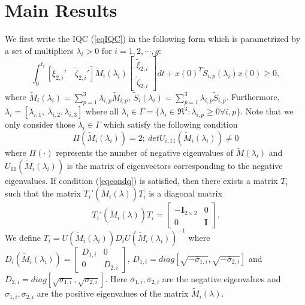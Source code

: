 \documentclass[twocolumn]{autart}
\begin{document}
\section{Main Results}\label{sec:main}
We first write the IQC (\ref{eqIQC}) in the following form which is parametrized by a set of multipliers $\lambda_i>0$ for $i=1,2,\cdots,g$:
\begin{equation}
\label{eqIQCM}
\int_0^{t_i}  [\tilde{\xi}_{2,i}' \quad \tilde{\zeta}_{2,i}'] \tilde{M}_{i}(\lambda_i) \left[
\begin{array}{c}
\tilde{\xi}_{2,i}\\
\tilde{\zeta}_{2,i}
\end{array}\right] dt +x(0)^T \tilde{S}_{i,p}(\lambda_i) x(0)\geq 0,
\end{equation}
where $\tilde{M}_{i}(\lambda_i)=\sum_{p=1}^3 \lambda_{i,p} \tilde{M}_{i,p}$, $\tilde{S}_{i}(\lambda_i)=\sum_{p=1}^3 \lambda_{i,p} \tilde{S}_{i,p}$. Furthermore, $\lambda_i=[\lambda_{i,1},~\lambda_{i,2}, \lambda_{i,3}]$ where all $\lambda_i\in \Gamma=\{\lambda_i \in \Re^3 : \lambda_{i,p}\geq 0 \forall i, p \}$. Note that we only consider those $\lambda_i \in \Gamma$ which satisfy the following condition
\begin{equation}
\label{eqcondq}
\Pi(\tilde{M}_i(\lambda_i))=2; ~det U_{i,11}(\tilde{M}_i(\lambda_i))\neq0
\end{equation}
where  $\Pi(\cdot)$ represents the number of negative eigenvalues of $\tilde{M}(\lambda_i)$  and $U_{11}(\tilde{M}_i(\lambda_i))$ is the matrix of eigenvectors corresponding to the negative eigenvalues. 
If condition (\ref{eqcondq}) is satisfied, then there exists a matrix $T_i$ such that the matrix $T_i'(\tilde{M}_i(\lambda))T_i$ is a diagonal matrix 
\begin{equation}
T_i'(\tilde{M}_i(\lambda))T_i=\left[
\begin{array}{cc}
-\mathbf{I}_{2\times 2} & 0 \\
0 & \mathbf{I}
\end{array}\right].
\end{equation}
We define $T_i=U(\tilde{M}_i(\lambda_i)) D_i U(\tilde{M}_i(\lambda_i))^{-1}$
where $D_i(\tilde{M}_i(\lambda_i))=\left[
\begin{array}{cc}
D_{1,i} & 0 \\
0 & D_{2,i}
\end{array}\right]$, $D_{1,i}=diag[\sqrt{-\bar{\sigma}_{1,i}}, \sqrt{-\bar{\sigma}_{2,i}}]$ and  $D_{2,i}= diag [\sqrt{{\sigma}_{1,i}},\sqrt{{\sigma}_{2,i}}]$. Here ${\bar{\sigma}_{1,i}},{\bar{\sigma}_{2,i}}$ are the negative eigenvalues and ${{\sigma}_{1,i}},{{\sigma}_{{2,i}}}$ are the positive eigenvalues of the matrix $\tilde{M}_i(\lambda)$.
\end{document}
